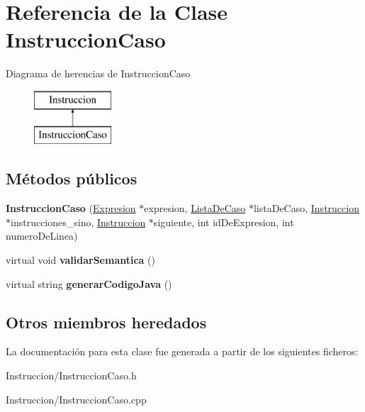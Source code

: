 \hypertarget{class_instruccion_caso}{\section{Referencia de la Clase Instruccion\-Caso}
\label{class_instruccion_caso}
}
Diagrama de herencias de Instruccion\-Caso\begin{figure}[H]
\begin{center}
\leavevmode
\includegraphics[height=2.000000cm]{class_instruccion_caso}
\end{center}
\end{figure}
\subsection*{Métodos públicos}
\begin{DoxyCompactItemize}
\item 
\hypertarget{class_instruccion_caso_a88695ac9095d9a47fa5320b14fa90fe1}{{\bfseries Instruccion\-Caso} (\hyperlink{class_expresion}{Expresion} $\ast$expresion, \hyperlink{class_lista_de_caso}{Lista\-De\-Caso} $\ast$lista\-De\-Caso, \hyperlink{class_instruccion}{Instruccion} $\ast$instrucciones\-\_\-sino, \hyperlink{class_instruccion}{Instruccion} $\ast$siguiente, int id\-De\-Expresion, int numero\-De\-Linea)}\label{class_instruccion_caso_a88695ac9095d9a47fa5320b14fa90fe1}

\item 
\hypertarget{class_instruccion_caso_a1cc6a7209dae143c54ae67d2dfab3c6d}{virtual void {\bfseries validar\-Semantica} ()}\label{class_instruccion_caso_a1cc6a7209dae143c54ae67d2dfab3c6d}

\item 
\hypertarget{class_instruccion_caso_a0b4516e2d9342f357f8877b6771c3b40}{virtual string {\bfseries generar\-Codigo\-Java} ()}\label{class_instruccion_caso_a0b4516e2d9342f357f8877b6771c3b40}

\end{DoxyCompactItemize}
\subsection*{Otros miembros heredados}


La documentación para esta clase fue generada a partir de los siguientes ficheros\-:\begin{DoxyCompactItemize}
\item 
Instruccion/Instruccion\-Caso.\-h\item 
Instruccion/Instruccion\-Caso.\-cpp\end{DoxyCompactItemize}

